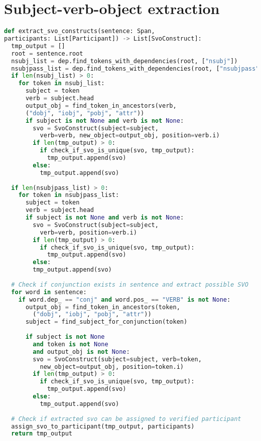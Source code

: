 \section{Subject-verb-object extraction}
\begin{lstlisting}[language=Python, caption={Subject-Verb-Object extraction function listing}, label={lst:svo_extraction}]
def extract_svo_constructs(sentence: Span,
participants: List[Participant]) -> List[SvoConstruct]:
  tmp_output = []
  root = sentence.root
  nsubj_list = dep.find_tokens_with_dependencies(root, ["nsubj"])
  nsubjpass_list = dep.find_tokens_with_dependencies(root, ["nsubjpass"])
  if len(nsubj_list) > 0:
    for token in nsubj_list:
      subject = token
      verb = subject.head
      output_obj = find_token_in_ancestors(verb,
      ("dobj", "iobj", "pobj", "attr"))
      if subject is not None and verb is not None:
        svo = SvoConstruct(subject=subject, 
          verb=verb, new_object=output_obj, position=verb.i)
        if len(tmp_output) > 0:
          if check_if_svo_is_unique(svo, tmp_output):
            tmp_output.append(svo)
        else:
          tmp_output.append(svo)
    
  if len(nsubjpass_list) > 0:
    for token in nsubjpass_list:
      subject = token
      verb = subject.head
      if subject is not None and verb is not None:
        svo = SvoConstruct(subject=subject, 
          verb=verb, position=verb.i)
        if len(tmp_output) > 0:
          if check_if_svo_is_unique(svo, tmp_output):
            tmp_output.append(svo)
        else:
        tmp_output.append(svo)
  
  # Check if conjunction exists in sentence and extract possible SVO
  for word in sentence:
    if word.dep_ == "conj" and word.pos_ == "VERB" is not None:
      output_obj = find_token_in_ancestors(token,
        ("dobj", "iobj", "pobj", "attr"))
      subject = find_subject_for_conjunction(token)
      
      if subject is not None 
        and token is not None 
        and output_obj is not None:
        svo = SvoConstruct(subject=subject, verb=token, 
          new_object=output_obj, position=token.i)
        if len(tmp_output) > 0:
          if check_if_svo_is_unique(svo, tmp_output):
            tmp_output.append(svo)
        else:
          tmp_output.append(svo)
  
  # Check if extracted svo can be assigned to verified participant
  assign_svo_to_participant(tmp_output, participants)
  return tmp_output
\end{lstlisting}

